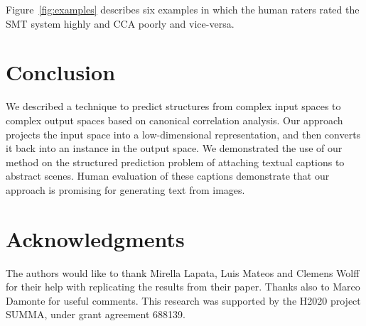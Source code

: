 \documentclass[letterpaper]{article}
\begin{document}
Figure~\ref{fig:examples} describes six examples in which the human raters rated the SMT system highly and CCA poorly and vice-versa.

\section{Conclusion}

We described a technique to predict structures from complex input spaces
to complex output spaces based on canonical correlation analysis.
Our approach projects the input space into a low-dimensional representation,
and then converts it back into an instance in the output space.
We demonstrated the use of our method on the structured prediction problem
of attaching textual captions to abstract scenes. Human evaluation of these
captions demonstrate that our approach is promising for generating text
from images.

\section*{Acknowledgments}

The authors would like to thank Mirella Lapata, Luis Mateos and Clemens Wolff
for their help with replicating the results from their paper.
Thanks also to Marco Damonte for useful comments.
This research was supported by the H2020 project SUMMA, under grant agreement 688139.




\end{document}
